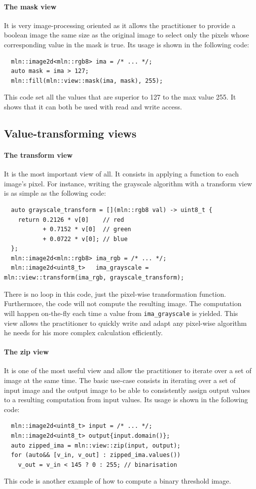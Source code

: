 \paragraph{The mask view} It is very image-processing oriented as it allows the practitioner to provide a boolean image
the same size as the original image to select only the pixels whose corresponding value in the mask is true. Its usage
is shown in the following code:
\begin{verbatim}
  mln::image2d<mln::rgb8> ima = /* ... */;
  auto mask = ima > 127;
  mln::fill(mln::view::mask(ima, mask), 255);
\end{verbatim}
This code set all the values that are superior to 127 to the max value 255. It shows that it can both be used with read
and write access.


\subsection{Value-transforming views}

\paragraph{The transform view} It is the most important view of all. It consists in applying a function to each image's
pixel. For instance, writing the grayscale algorithm with a transform view is as simple as the following code:
\begin{verbatim}
  auto grayscale_transform = [](mln::rgb8 val) -> uint8_t {
    return 0.2126 * v[0]    // red
           + 0.7152 * v[0]  // green
           + 0.0722 * v[0]; // blue
  };
  mln::image2d<mln::rgb8> ima_rgb = /* ... */;
  mln::image2d<uint8_t>   ima_grayscale = mln::view::transform(ima_rgb, grayscale_transform);
\end{verbatim}
There is no loop in this code, just the pixel-wise transformation function. Furthermore, the code will not compute the
resulting image. The computation will happen on-the-fly each time a value from \texttt{ima\_grayscale} is yielded.
This view allows the practitioner to quickly write and adapt any pixel-wise algorithm he needs for his more complex
calculation efficiently.

\paragraph{The zip view} It is one of the most useful view and allow the practitioner to iterate over a set of image at
the same time. The basic use-case consists in iterating over a set of input image and the output image to be able to
consistently assign output values to a resulting computation from input values. Its usage is shown in the following
code:
\begin{verbatim}
  mln::image2d<uint8_t> input = /* ... */;
  mln::image2d<uint8_t> output{input.domain()};
  auto zipped_ima = mln::view::zip(input, output);
  for (auto&& [v_in, v_out] : zipped_ima.values())
    v_out = v_in < 145 ? 0 : 255; // binarisation
\end{verbatim}
This code is another example of how to compute a binary threshold image.

